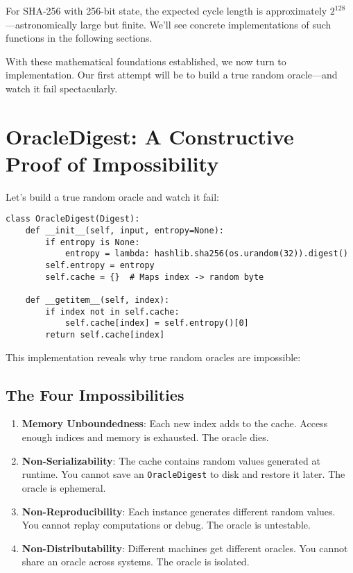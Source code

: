 \documentclass[11pt]{article}
\begin{document}
For SHA-256 with 256-bit state, the expected cycle length is approximately $2^{128}$---astronomically large but finite. We'll see concrete implementations of such functions in the following sections.

With these mathematical foundations established, we now turn to implementation. Our first attempt will be to build a true random oracle---and watch it fail spectacularly.

\section{OracleDigest: A Constructive Proof of Impossibility}

Let's build a true random oracle and watch it fail:

\begin{lstlisting}
class OracleDigest(Digest):
    def __init__(self, input, entropy=None):
        if entropy is None:
            entropy = lambda: hashlib.sha256(os.urandom(32)).digest()
        self.entropy = entropy
        self.cache = {}  # Maps index -> random byte
    
    def __getitem__(self, index):
        if index not in self.cache:
            self.cache[index] = self.entropy()[0]
        return self.cache[index]
\end{lstlisting}

This implementation reveals why true random oracles are impossible:

\subsection{The Four Impossibilities}

\begin{enumerate}
\item \textbf{Memory Unboundedness}: Each new index adds to the cache. Access enough indices and memory is exhausted. The oracle dies.

\item \textbf{Non-Serializability}: The cache contains random values generated at runtime. You cannot save an \texttt{OracleDigest} to disk and restore it later. The oracle is ephemeral.

\item \textbf{Non-Reproducibility}: Each instance generates different random values. You cannot replay computations or debug. The oracle is untestable.

\item \textbf{Non-Distributability}: Different machines get different oracles. You cannot share an oracle across systems. The oracle is isolated.
\end{enumerate}
\end{document}
